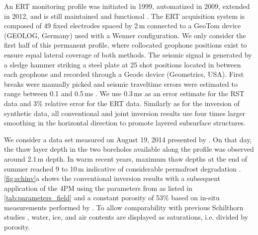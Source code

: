 \documentclass[extra]{gji}
\begin{document}
An ERT monitoring profile was initiated in 1999, automatized in 2009, extended in 2012, and is still maintained and functional \citep[for data acquisition and preprocessing details see][]{Hilbich2008,Hilbich2011,Mollaret2018}.
The ERT acquisition system is composed of 49 fixed electrodes spaced by 2\,m connected to a GeoTom device (GEOLOG, Germany) used with a Wenner configuration.
We only consider the first half of this permanent profile, where collocated geophone positions exist to ensure equal lateral coverage of both methods.
The seismic signal is generated by a sledge hammer striking a steel plate at 25 shot positions located in between each geophone and recorded through a Geode device (Geometrics, USA).
First breaks were manually picked and seismic traveltime errors were estimated to range between 0.1 and 0.5\,ms \citep{Hilbich2010}.
We use 0.3\,ms as an error estimate for the RST data and 3\% relative error for the ERT data.
Similarly as for the inversion of synthetic data, all conventional and joint inversion results use four times larger smoothing in the horizontal direction to promote layered subsurface structures.

We consider a data set measured on August 19, 2014 presented by \cite{Pellet2016}.
On that day, the thaw layer depth in the two boreholes available along the profile was observed around 2.1\,m depth.
In warm recent years, maximum thaw depths at the end of summer reached 9 to 10\,m indicative of considerable permafrost degradation \citep{Permos2019}.
\autoref{fig:schinv}a shows the conventional inversion results with a subsequent application of the 4PM using the parameters from \cite{Pellet2016} as listed in \autoref{tab:parameters_field} and a constant porosity of 53\% based on in-situ measurements performed by \citep{Scherler2006}.
To allow comparability with previous Schilthorn studies \citep[e.g.,][]{Hilbich2008,Pellet2016}, water, ice, and air contents are displayed as saturations, i.e. divided by porosity.
\end{document}
